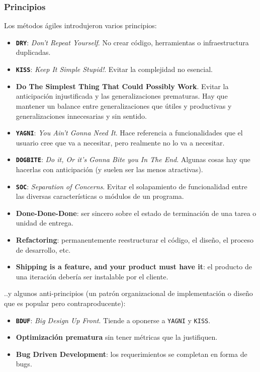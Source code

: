 \documentclass[]{article}
\begin{document}
\subsubsection{Principios}
Los métodos ágiles introdujeron varios principios:
\begin{itemize}
	\item \textbf{\texttt{DRY}}: \emph{Don't Repeat Yourself}. No crear código, herramientas o infraestructura duplicadas.
	\item \textbf{\texttt{KISS}}: \emph{Keep It Simple Stupid!}. Evitar la complejidad no esencial.
	\item \textbf{Do The Simplest Thing That Could Possibly Work}. Evitar la anticipación injustificada y las generalizaciones prematuras. Hay que mantener un balance entre generalizaciones que útiles y productivas y generalizaciones innecesarias y sin sentido.
	\item \textbf{\texttt{YAGNI}}: \emph{You Ain't Gonna Need It}. Hace referencia a funcionalidades que el usuario cree que va a necesitar, pero realmente no lo va a necesitar.
	\item \textbf{\texttt{DOGBITE}}: \emph{Do it, Or it's Gonna Bite you In The End}. Algunas cosas hay que hacerlas con anticipación (y suelen ser las menos atractivas).
	\item \textbf{\texttt{SOC}}: \emph{Separation of Concerns}. Evitar el solapamiento de funcionalidad entre las diversas características o módulos de un programa.
	\item \textbf{Done-Done-Done}: ser sincero sobre el estado de terminación de una tarea o unidad de entrega.
	\item \textbf{Refactoring}: permanentemente reestructurar el código, el diseño, el proceso de desarrollo, etc.
	\item \textbf{Shipping is a feature, and your product must have it}: el producto de una iteración debería ser instalable por el cliente.
\end{itemize}

..y algunos anti-principios (un patrón organizacional de implementación o diseño que es popular pero contraproducente):
\begin{itemize}
	\item \textbf{\texttt{BDUF}}: \emph{Big Design Up Front}. Tiende a oponerse a \texttt{YAGNI} y \texttt{KISS}.
	\item \textbf{Optimización prematura} sin tener métricas que la justifiquen.
	\item \textbf{Bug Driven Development}: los requerimientos se completan en forma de bugs.
\end{itemize}
\end{document}
